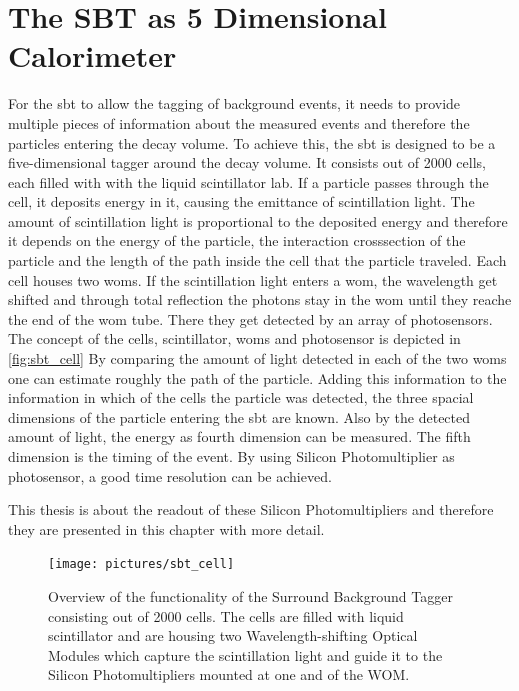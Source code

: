 \chapter{The SBT as 5 Dimensional Calorimeter}
For the \ac{sbt} to allow the tagging of background events, it needs to provide multiple pieces of information about the measured events and therefore the particles entering the decay volume. 
To achieve this, the \ac{sbt} is designed to be a five-dimensional tagger around the decay volume. 
It consists out of 2000 cells, each filled with with the liquid scintillator \ac{lab}.
If a particle passes through the cell, it deposits energy in it, causing the emittance of scintillation light.
The amount of scintillation light is proportional to the deposited energy and therefore it depends on the energy of the particle, the interaction crosssection of the particle and the length of the path inside the cell that the particle traveled.
Each cell houses two \acp{wom}.
If the scintillation light enters a \ac{wom}, the wavelength get shifted and through total reflection the photons stay in the \ac{wom} until they reache the end of the \ac{wom} tube.
There they get detected by an array of photosensors. 
The concept of the cells, scintillator, \acp{wom} and photosensor is depicted in \autoref{fig:sbt_cell}
By comparing the amount of light detected in each of the two \acp{wom} one can estimate roughly the path of the particle.
Adding this information to the information in which of the cells the particle was detected, the three spacial dimensions of the particle entering the \ac{sbt} are known.
Also by the detected amount of light, the energy as fourth dimension can be measured.
The fifth dimension is the timing of the event. 
By using Silicon Photomultiplier as photosensor, a good time resolution can be achieved.

This thesis is about the readout of these Silicon Photomultipliers and therefore they are presented in this chapter with more detail.

\begin{figure}
	\centering
	\texttt{[image: pictures/sbt\_cell]}
	\caption[Overview of the SBT]{Overview of the functionality of the Surround Background Tagger consisting out of 2000 cells. The cells are filled with liquid scintillator and are housing two Wavelength-shifting Optical Modules which capture the scintillation light and guide it to the Silicon Photomultipliers mounted at one and of the WOM. \cite{bsc_jonathan}}
	\label{fig:sbt_cell}
\end{figure}



